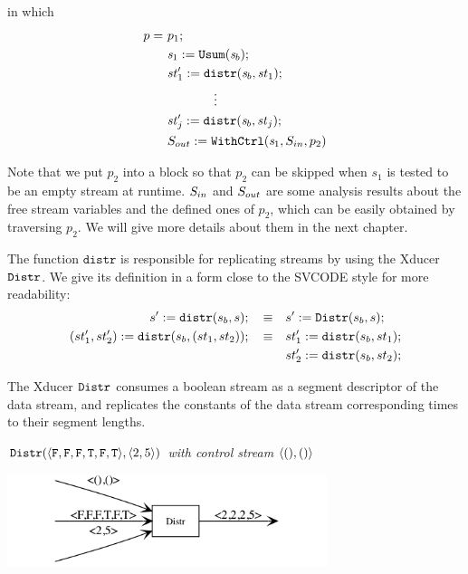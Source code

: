 \def\Distr#1#2{\mathtt{distr}(#1,#2)}
\def\Pack#1#2#3{\mathtt{pack}_{#3}(#1,#2)}

in which $$ \begin{aligned}
p = & \ p_1; \\
    & \ \sdef{\s_1}{\usum(\s_b)}; \\
	& \ \sdef{\st_1'}{\Distr{\s_b}{\st_1}}; \\
	& \qquad \qquad \vdots \\
	& \ \sdef{\st_j'}{\Distr{\s_b}{\st_j}}; \\
	& \ \withctrl{\s_1}{p_2}{\Sin}{\Sout} \\
\end{aligned}$$	

Note that we put $p_2$ into a \wc block so that $p_2$ can be skipped when $s_1$ is tested to be an empty stream at runtime.
$S_{in}$ and $S_{out}$  are some analysis results about the free stream variables and the defined ones of $p_2$, which can be easily obtained by traversing $p_2$. We will give more details about them in the next chapter.

The function $\mathtt{distr}$ is responsible for replicating streams by using the Xducer $\mathtt{Distr}$. 
We give its definition in a form close to the SVCODE style for more readability:
\begin{align*}
	s' := \Distr{s_b}{s}; \quad \equiv & \quad s' := \distrf{s_b}{s}; \\
	(st'_1,st'_2)  := \Distr{s_b}{(st_1,st_2)}; \quad \equiv & \quad st_1' := \Distr{s_b}{st_1}; \\ 
	&\quad st_2' := \Distr{s_b}{st_2};
\end{align*}

The Xducer $\mathtt{Distr}$ consumes a boolean stream as a segment descriptor of the data stream, and replicates the constants of the data stream corresponding times to their segment lengths.
\begin{example} \emph{$\distrf{\<\F,\F,\F,\T,\F,\T\'>}{\< 2,5 \'>}$ with control stream $\< (),() \'>$}\\
	\begin{center}
		\includegraphics[width=0.7\textwidth]{fig/distr.png}
	\end{center}
\end{example}



